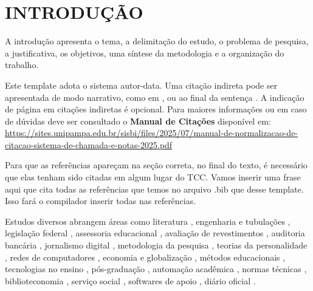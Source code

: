 
\chapter{INTRODUÇÃO}

A introdução apresenta o tema, a delimitação do estudo, o problema de pesquisa, a justificativa, os objetivos, uma síntese da metodologia e a organização do trabalho.

Este template adota o sistema autor-data. Uma citação indireta pode ser apresentada de modo narrativo, como em , ou ao final da sentença \cite{gil2022}. A indicação de página em citações indiretas é opcional. Para maiores informações ou em caso de dúvidas deve ser  consultado o \textbf{Manual de Citações} disponível em: \url{https://sites.unipampa.edu.br/sisbi/files/2025/07/manual-de-normalizacao-de-citacao-sistema-de-chamada-e-notas-2025.pdf}


Para que as referências apareçam na seção correta, no final do texto, é necessário que elas tenham sido citadas em algum lugar do TCC. Vamos inserir uma frase aqui que cita todas as referências que temos no arquivo .bib que desse template. Isso fará o compilador inserir todas nas referências.

Estudos diversos abrangem áreas como literatura \cite{alves2000}, engenharia e tubulações \cite{bailona2006}, legislação federal \cite{brasil1988, brasil2024}, assessoria educacional \cite{cassol2003}, avaliação de revestimentos \cite{courtes2018}, auditoria bancária \cite{dantas2014}, jornalismo digital \cite{ferreira2003}, metodologia da pesquisa \cite{gil2022, ruiz2008}, teorias da personalidade \cite{hall2000}, redes de computadores \cite{jonack2006}, economia e globalização \cite{lacerda1998, mariano2005}, métodos educacionais \cite{capitulo2024}, tecnologias no ensino \cite{artigo2025}, pós-graduação \cite{dissertacao2023}, automação acadêmica \cite{evento2024}, normas técnicas \cite{abnt14724, unipampa2025manual}, biblioteconomia \cite{silva2012}, serviço social \cite{simoes2009}, softwares de apoio \cite{software2026}, diário oficial \cite{brasil1988}.

